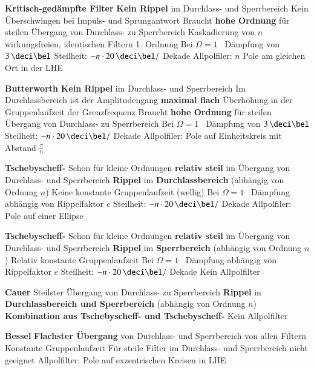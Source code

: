 \begin{outline}
    \1 \textbf{Kritisch-gedämpfte Filter}
        \2[+] \textbf{Kein Rippel} im Durchlass- und Sperrbereich
        \2[+] Kein Überschwingen bei Impuls- und Sprungantwort
        \2[-] Braucht \textbf{hohe Ordnung} für steilen Übergang von Durchlass- zu Sperrbereich
        \2    Kaskadierung von $n$ wirkungsfreien, identischen Filtern 1. Ordnung
        \2    Bei $\Omega = 1$ \textrightarrow\ Dämpfung von $3 \, \deci \bel$
        \2    Steilheit: $- n \cdot 20 \, \deci \bel /$ Dekade
        \2    Allpolfiler: $n$ Pole am gleichen Ort in der LHE

    \1 \textbf{Butterworth}
        \2[+] \textbf{Kein Rippel} im Durchlass- und Sperrbereich
        \2[+] Im Durchlassbereich ist der Amplitudengang \textbf{maximal flach}
        \2[-] Überhöhung in der Gruppenlaufzeit der Grenzfrequenz
        \2[-] Braucht \textbf{hohe Ordnung} für steilen Übergang von Durchlass- zu Sperrbereich
        \2    Bei $\Omega = 1$ \textrightarrow\ Dämpfung von $3 \, \deci \bel$
        \2    Steilheit: $- n \cdot 20 \, \deci \bel /$ Dekade
        \2    Allpolfiler: Pole auf Einheitskreis mit Abstand $\frac{\pi}{n}$ 

    \1 \textbf{Tschebyscheff-}
        \2[+] Schon für kleine Ordnungen \textbf{relativ steil} im Übergang von Durchlass- und Sperrbereich
        \2[-] \textbf{Rippel} im \textbf{Durchlassbereich} (abhängig von Ordnung $n$)
        \2[-] Keine konstante Gruppenlaufzeit (wellig)
        \2    Bei $\Omega = 1$ \textrightarrow\ Dämpfung abhängig von Rippelfaktor $e$
        \2    Steilheit: $- n \cdot 20 \, \deci \bel /$ Dekade
        \2    Allpolfiler: Pole auf einer Ellipse

    \1 \textbf{Tschebyscheff-}
        \2[+] Schon für kleine Ordnungen \textbf{relativ steil} im Übergang von Durchlass- und Sperrbereich
        \2[-] \textbf{Rippel} im \textbf{Sperrbereich} (abhängig von Ordnung $n$)
        \2[-] Relativ konstante Gruppenlaufzeit
        \2    Bei $\Omega = 1$ \textrightarrow\ Dämpfung abhängig von Rippelfaktor $e$
        \2    Steilheit: $- n \cdot 20 \, \deci \bel /$ Dekade
        \2    Kein Allpolfilter

    \1 \textbf{Cauer}
        \2[+] Steilster Übergang von Durchlass- zu Sperrbereich
        \2[-] \textbf{Rippel} in \textbf{Durchlassbereich und Sperrbereich} (abhängig von Ordnung $n$)
        \2    \textbf{Kombination aus Tschebyscheff- und Tschebyscheff-}
        \2    Kein Allpolfilter

    \1 \textbf{Bessel}
        \2[+] \textbf{Flachster Übergang} von Durchlass- und Sperrbereich von allen Filtern
        \2[+] Konstante Gruppenlaufzeit
        \2[-] Für steile Filter im Durchlass- und Sperrbereich nicht geeignet
        \2    Allpolfilter: Pole auf exzentrischen Kreisen in LHE
\end{outline}



